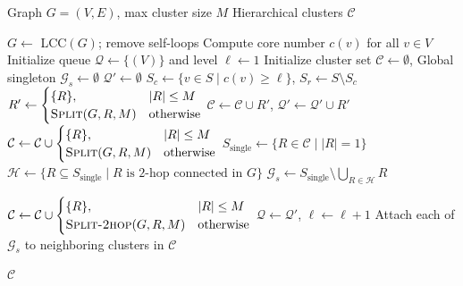 \documentclass[sigconf]{acmart}
\newcommand{\KHC}{\texttt{RkH}\,}
\begin{document}
\begin{algorithm}[!t]
\small
\caption{\KHC: Residual-aware $k$-core Hierarchy\,($G$,\,$M$)}
\label{alg:split_large}
\begin{algorithmic}[1]
\REQUIRE Graph $G=(V,E)$, max cluster size $M$ \label{line:req}
\ENSURE Hierarchical clusters $\mathcal{C}$ \label{line:ensure}

\STATE $G \leftarrow$ LCC$(G)$; remove self-loops \label{line:lcc}
\STATE Compute core number $c(v)$ for all $v \in V$ \label{line:core}
\STATE Initialize queue $\mathcal{Q} \leftarrow \{(V)\}$ and level $\ell \leftarrow 1$ \label{line:init_queue}
\STATE Initialize cluster set $\mathcal{C} \leftarrow \emptyset$, Global singleton $\mathcal{G}_s \leftarrow \emptyset $ \label{line:init_cluster}
 \label{line:while_start}
  \STATE $\mathcal{Q}' \leftarrow \emptyset$ \label{line:qprime}
   \label{line:for_S}
    \STATE $S_c \leftarrow \{v\in S \mid c(v)\ge \ell\}$, $S_r \leftarrow S\setminus S_c$ \label{line:sc_sr}
     \label{line:for_KC}
          \STATE $R' \gets
          \begin{cases}
      \{R\}, & |R| \le M \\
      \textsc{Split}(G, R, M) & \text{otherwise}
      \end{cases}$
        \STATE $\mathcal{C} \gets \mathcal{C} \cup R'$,  $\mathcal{Q}' \gets \mathcal{Q}' \cup R'$   \label{line:add_KC}
    \ENDFOR
     \label{line:for_R}
      \STATE $\mathcal{C} \gets \mathcal{C} \cup 
      \begin{cases}
      \{R\}, & |R| \le M \\
      \textsc{Split}(G, R, M) & \text{otherwise}
      \end{cases}$ \label{line:add_R}
    \ENDFOR
           \STATE $S_{\text{single}} \gets \{ R \in \mathcal{C} \mid |R| = 1 \}$  \label{line:collect_singletons}
    \STATE $\mathcal{H} \gets \{ R \subseteq S_{\text{single}} \mid R \text{ is 2-hop connected in } G \}$ \label{line:form_2hop}
    \STATE $\mathcal{G}_s \gets S_{\text{single}} \setminus \bigcup_{R \in \mathcal{H}} R$ \label{line:collect_global_singletons}

      \label{line:group_2hop}
     \label{line:for_H}
      \STATE $\mathcal{C} \gets \mathcal{C} \cup 
      \begin{cases}
      \{R\}, & |R|\le M \\
      \textsc{Split-2hop}(G, R, M) & \text{otherwise}
      \end{cases}$ \label{line:add_H}
    \ENDFOR
  \ENDFOR
  \STATE $\mathcal{Q} \leftarrow \mathcal{Q}'$, $\ell \leftarrow \ell+1$ \label{line:update_queue}
\ENDWHILE \label{line:while_end}
\STATE Attach each of $\mathcal{G}_s$  to neighboring clusters in $\mathcal{C}$ \label{line:attach_singletons}


\RETURN $\mathcal{C}$ \label{line:return}
\end{algorithmic}
\end{algorithm}
\end{document}
